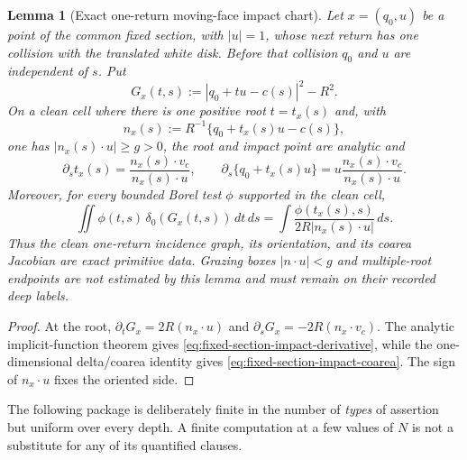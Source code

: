 \documentclass[11pt]{article}
\newtheorem{lemma}[theorem]{Lemma}
\begin{document}
\begin{lemma}[Exact one-return moving-face impact chart]
\label{lem:fixed-section-impact-coarea}
Let $x=(q_0,u)$ be a point of the common fixed section, with $|u|=1$, whose
next return has one collision with the translated white disk.  Before that
collision $q_0$ and $u$ are independent of $s$.  Put
\begin{equation}
 G_x(t,s):=|q_0+tu-c(s)|^2-R^2.
\label{eq:fixed-section-impact-equation}
\end{equation}
On a clean cell where there is one positive root $t=t_x(s)$ and, with
\[
 n_x(s):=R^{-1}\{q_0+t_x(s)u-c(s)\},
\]
one has $|n_x(s)\cdot u|\ge g>0$, the root and impact point are analytic and
\begin{equation}
 \partial_st_x(s)=
 \frac{n_x(s)\cdot v_c}{n_x(s)\cdot u},
 \qquad
 \partial_s\{q_0+t_x(s)u\}
 =u\frac{n_x(s)\cdot v_c}{n_x(s)\cdot u}.
\label{eq:fixed-section-impact-derivative}
\end{equation}
Moreover, for every bounded Borel test $\phi$ supported in the clean cell,
\begin{equation}
 \iint \phi(t,s)\,\delta_0(G_x(t,s))\,dt\,ds
 =
 \int
 \frac{\phi(t_x(s),s)}
 {2R|n_x(s)\cdot u|}\,ds.
\label{eq:fixed-section-impact-coarea}
\end{equation}
Thus the clean one-return incidence graph, its orientation, and its coarea
Jacobian are exact primitive data.  Grazing boxes $|n\cdot u|<g$ and
multiple-root endpoints are not estimated by this lemma and must remain on
their recorded deep labels.
\end{lemma}

\begin{proof}
At the root,
$\partial_tG_x=2R(n_x\cdot u)$ and
$\partial_sG_x=-2R(n_x\cdot v_c)$.  The analytic implicit-function theorem
gives \eqref{eq:fixed-section-impact-derivative}, while the one-dimensional
delta/coarea identity gives \eqref{eq:fixed-section-impact-coarea}.  The
sign of $n_x\cdot u$ fixes the oriented side.
\end{proof}

The following package is deliberately finite in the number of \emph{types}
of assertion but uniform over every depth.  A finite computation at a few
values of $N$ is not a substitute for any of its quantified clauses.
\end{document}

